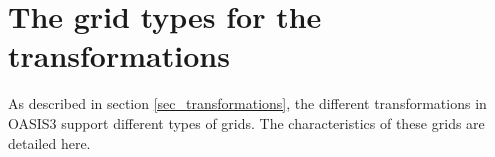 \newpage
\appendix
\chapter{The grid types for the transformations}
\label{subsec_gridtypes}

As described in section \ref{sec_transformations}, the different
transformations in OASIS3 support different types of grids. The
characteristics of these grids are detailed here.

\begin{enumerate}

%
% 
%
%
%  

\end{enumerate}
